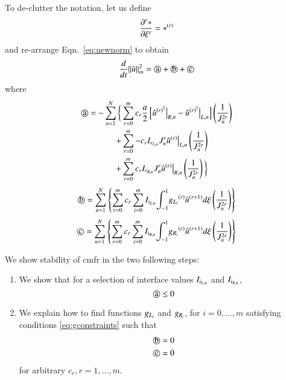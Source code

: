 To de-clutter the notation, let us define $${\frac{\partial^{r} {*}}{\partial \xi^{r}}} = {*}^{\left(r\right)} $$ and re-arrange Eqn.~\eqref{eq:newnorm} to obtain
\begin{equation}
\label{eq:timenorm}
 \DD{}{t}||\urd||^2_m = \text{\textcircled{a}} + \text{\textcircled{b}} + \text{\textcircled{c}}
\end{equation}
where
\begin{equation}
\begin{split}
 \label{eq:simpNormA}
 \text{\textcircled{a}} = -\sum_{n=1}^{N}  \bigg\{& 
 \sum^m_{r=0} c_r  \frac{a}{2} 
 \l[ \urd^{{(r)}^2} \big|_{R,n} - \urd^{{(r)}^2} \big|_{L,n} \r] 
 \l( \frac{1}{J_n^{2r}} \r) \\
 +& \sum^m_{r=0} -c_r \IL[r] J_n^r\urd^{(r)} \big|_{L,n} \l(
\frac{1}{J_n^{2r}}\r)\\
 +& \sum^m_{r=0} c_r \IR[r] J_n^r\urd^{(r)} \big|_{R,n} \l( \frac{1}{J_n^{2r}}\r)
 \bigg\} 
\end{split}
\end{equation}
\begin{equation}\label{eq:b_def}
 \text{\textcircled{b}} = \sum_{n=1}^{N} \left\{ 
 \sum^m_{r=0} c_r \sum^m_{i=0} {I_{i_{L,n}}} {\int^1_{-1}} {{g_{L_i}}}^{\left(r\right)} \hat{u}^{{ (r+1)}} d\xi \left(
\frac{1}{J_n^{2r}}\right) \right\}
\end{equation}
\begin{equation}\label{eq:c_def}
 \text{\textcircled{c}} = \sum_{n=1}^{N}  \left\{ 
 \sum^m_{r=0} c_r \sum^m_{i=0} {I_{i_{R,n}}} {\int^1_{-1}} {{g_{R_i}}}^{\left(r\right)} \hat{u}^{{ (r+1)}} d\xi \left(
\frac{1}{J_n^{2r}}\right) \right\}
\end{equation}


We show stability of \gls{cmfr} in the two following steps:
\begin{enumerate}
 \item We show that for a selection of interface values ${I_{i_{L,n}}} $ and ${I_{i_{R,n}}} $, 
 \begin{equation}\label{eq:a_le_0}
\text{\textcircled{a}} \le 0
 \end{equation}
 \item We explain how to find functions ${g_{L_i}} $ and ${g_{R_i}} $, for $i = 0,\ldots,m $ satisfying
conditions \eqref{eq:gconstraints} such that
\begin{equation}\label{eq:bc_equal_0}
\begin{split}
\text{\textcircled{b}}&=0\\
\text{\textcircled{c}}&=0
\end{split}
\end{equation}  
 for arbitrary
$c_r, r=1,\ldots,m$.
\end{enumerate}

